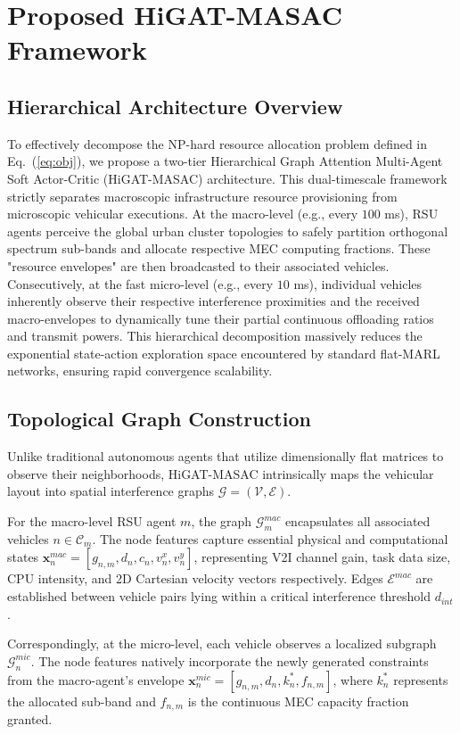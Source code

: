 \section{Proposed HiGAT-MASAC Framework}
\label{sec:algo}

\subsection{Hierarchical Architecture Overview}
To effectively decompose the NP-hard resource allocation problem defined in Eq.~(\ref{eq:obj}), we propose a two-tier Hierarchical Graph Attention Multi-Agent Soft Actor-Critic (HiGAT-MASAC) architecture. This dual-timescale framework strictly separates macroscopic infrastructure resource provisioning from microscopic vehicular executions. At the macro-level (e.g., every $100$ ms), RSU agents perceive the global urban cluster topologies to safely partition orthogonal spectrum sub-bands and allocate respective MEC computing fractions. These "resource envelopes" are then broadcasted to their associated vehicles. Consecutively, at the fast micro-level (e.g., every $10$ ms), individual vehicles inherently observe their respective interference proximities and the received macro-envelopes to dynamically tune their partial continuous offloading ratios and transmit powers. This hierarchical decomposition massively reduces the exponential state-action exploration space encountered by standard flat-MARL networks, ensuring rapid convergence scalability. 

\subsection{Topological Graph Construction}
Unlike traditional autonomous agents that utilize dimensionally flat matrices to observe their neighborhoods, HiGAT-MASAC intrinsically maps the vehicular layout into spatial interference graphs $\mathcal{G} = (\mathcal{V}, \mathcal{E})$. 

For the macro-level RSU agent $m$, the graph $\mathcal{G}_m^{mac}$ encapsulates all associated vehicles $n \in \mathcal{C}_m$. The node features capture essential physical and computational states $\mathbf{x}_n^{mac} = [g_{n,m}, d_n, c_n, v_n^x, v_n^y]$, representing V2I channel gain, task data size, CPU intensity, and 2D Cartesian velocity vectors respectively. Edges $\mathcal{E}^{mac}$ are established between vehicle pairs lying within a critical interference threshold $d_{int}$. 

Correspondingly, at the micro-level, each vehicle observes a localized subgraph $\mathcal{G}_n^{mic}$. The node features natively incorporate the newly generated constraints from the macro-agent's envelope $\mathbf{x}_n^{mic} = [g_{n,m}, d_n, k_n^*, f_{n,m}]$, where $k_n^*$ represents the allocated sub-band and $f_{n,m}$ is the continuous MEC capacity fraction granted.

